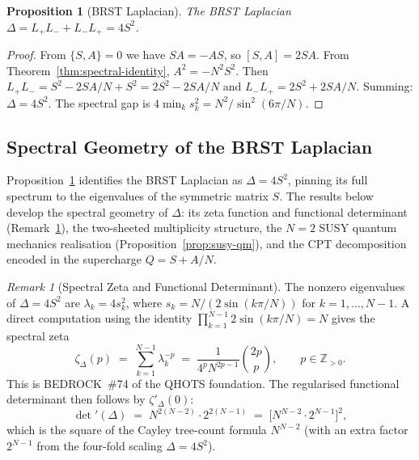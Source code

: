 \documentclass[aip,jmp,reprint,superscriptaddress,floatfix,nofootinbib]{revtex4-2}
\newtheorem{proposition}[theorem]{Proposition}
\theoremstyle{definition}
\theoremstyle{remark}
\newtheorem{remark}[theorem]{Remark}
\begin{document}
\begin{proposition}[BRST Laplacian]
\label{prop:laplacian}
The BRST Laplacian $\Delta = L_+ L_- + L_- L_+ = 4S^2$.
\end{proposition}
\begin{proof}
From $\{S,A\} = 0$ we have $SA = -AS$, so $[S,A] = 2SA$.
From Theorem~\ref{thm:spectral-identity}, $A^2 = -N^2 S^2$.
Then $L_+ L_- = S^2 - 2SA/N + S^2 = 2S^2 - 2SA/N$
and $L_- L_+ = 2S^2 + 2SA/N$. Summing: $\Delta = 4S^2$.
The spectral gap is $4\min_k s_k^2 = N^2/\sin^2(6\pi/N)$.
\end{proof}

\subsection{Spectral Geometry of the BRST Laplacian}
\label{sec:spectral-brst}

Proposition~\ref{prop:laplacian} identifies the BRST Laplacian as
$\Delta = 4S^2$, pinning its full spectrum to the eigenvalues of the
symmetric matrix $S$.  The results below develop the spectral
geometry of $\Delta$: its zeta function and functional determinant
(Remark~\ref{rmk:spectral-zeta}), the two-sheeted multiplicity
structure, the $N{=}2$ SUSY quantum mechanics realisation
(Proposition~\ref{prop:susy-qm}), and the CPT decomposition encoded in
the supercharge $Q = S + A/N$.

\begin{remark}[Spectral Zeta and Functional Determinant]
\label{rmk:spectral-zeta}
The nonzero eigenvalues of $\Delta = 4S^2$ are $\lambda_k = 4s_k^2$,
where $s_k = N/(2\sin(k\pi/N))$ for $k = 1,\dots,N-1$.
A direct computation using the identity
$\prod_{k=1}^{N-1} 2\sin(k\pi/N) = N$ gives the spectral zeta
\begin{equation}\label{eq:spectral-zeta}
  \zeta_{\Delta}(p) \;=\; \sum_{k=1}^{N-1} \lambda_k^{-p}
  \;=\; \frac{1}{4^p N^{2p-1}} \binom{2p}{p},
  \qquad p \in \mathbb{Z}_{>0}.
\end{equation}
This is BEDROCK~\#74 of the QHOTS foundation.
The regularised functional determinant then follows by $\zeta'_\Delta(0)$:
\begin{equation}\label{eq:func-det}
  \det'(\Delta) \;=\; N^{2(N-2)}\cdot 2^{2(N-1)}
  \;=\; \bigl[N^{N-2}\cdot 2^{N-1}\bigr]^{2},
\end{equation}
which is the square of the Cayley tree-count formula $N^{N-2}$ (with an
extra factor $2^{N-1}$ from the four-fold scaling $\Delta = 4S^2$).
\end{remark}
\end{document}
